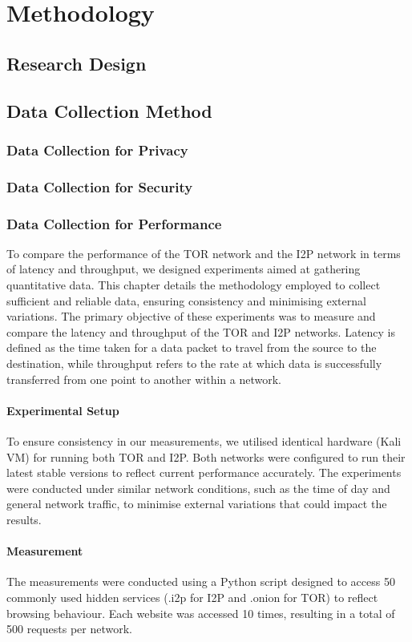 \documentclass[12pt,conference]{IEEEtran}
\begin{document}
\newpage
\section{Methodology}
\subsection{Research Design}
\subsection{Data Collection Method}
\subsubsection{Data Collection for Privacy}
\subsubsection{Data Collection for Security}
\subsubsection{Data Collection for Performance}
To compare the performance of the TOR network and the I2P network in terms of latency and throughput, we designed experiments aimed at gathering quantitative data. This chapter details the methodology employed to collect sufficient and reliable data, ensuring consistency and minimising external variations. The primary objective of these experiments was to measure and compare the latency and throughput of the TOR and I2P networks. Latency is defined as the time taken for a data packet to travel from the source to the destination, while throughput refers to the rate at which data is successfully transferred from one point to another within a network. 
\paragraph{Experimental Setup}
To ensure consistency in our measurements, we utilised identical hardware (Kali VM) for running both TOR and I2P. Both networks were configured to run their latest stable versions to reflect current performance accurately. The experiments were conducted under similar network conditions, such as the time of day and general network traffic, to minimise external variations that could impact the results.
\paragraph{Measurement} The measurements were conducted using a Python script designed to access 50 commonly used hidden services (.i2p for I2P and .onion for TOR) to reflect browsing behaviour. Each website was accessed 10 times, resulting in a total of 500 requests per network.
\end{document}

